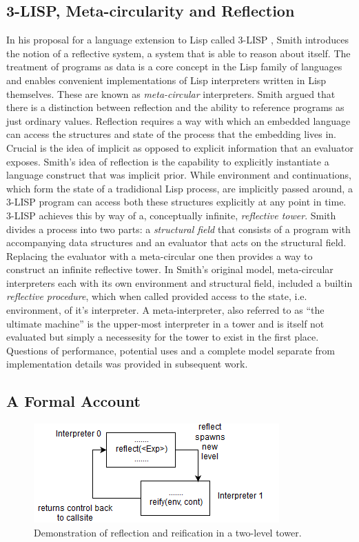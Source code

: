 \documentclass{article}
\theoremstyle{definition}
\begin{document}
\subsection{3-LISP, Meta-circularity and Reflection}
In his proposal for a language extension to Lisp called 3-LISP \cite{smith1984reflection}, Smith introduces the notion of a reflective system, a system that is able to reason about itself. The treatment of programs as data is a core concept in the Lisp family of languages and enables  convenient implementations of Lisp interpreters written in Lisp themselves. These are known as \textit{meta-circular} interpreters. Smith argued that there is a distinction between reflection and the ability to reference programs as just ordinary values. Reflection requires a way with which an embedded language can access the structures and state of the process that the embedding lives in. Crucial is the idea of implicit as opposed to explicit information that an evaluator exposes. Smith's idea of reflection is the capability to explicitly instantiate a language construct that was implicit prior. While environment and continuations, which form the state of a tradidional Lisp process, are implicitly passed around, a 3-LISP program can access both these structures explicitly at any point in time. 3-LISP achieves this by way of a, conceptually infinite, \textit{reflective tower}. Smith divides a process into two parts: a \textit{structural field} that consists of a program with accompanying data structures and an evaluator that acts on the structural field. Replacing the evaluator with a meta-circular one then provides a way to construct an infinite reflective tower. In Smith's original model, meta-circular interpreters each with its own environment and structural field, included a builtin \textit{reflective procedure}, which when called provided access to the state, i.e. environment, of it's interpreter. A meta-interpreter, also referred to as ``the ultimate machine'' is the upper-most interpreter in a tower and is itself not evaluated but simply a necessesity for the tower to exist in the first place. Questions of performance, potential uses and a complete model separate from implementation details was provided in subsequent work.
\subsection{A Formal Account}
\begin{figure}[t]
	\centering
	\includegraphics{refl_reif_tower.png}
	\caption{Demonstration of reflection and reification in a two-level tower.}\label{refl_reif_tower}
\end{figure}
\end{document}
